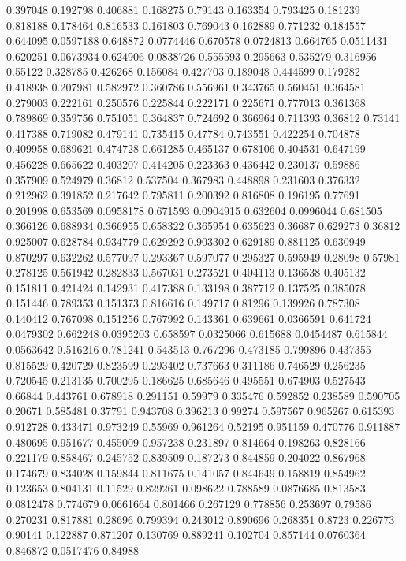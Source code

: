 0.397048 0.192798
0.406881 0.168275
0.79143 0.163354
0.793425 0.181239
0.818188 0.178464
0.816533 0.161803
0.769043 0.162889
0.771232 0.184557
0.644095 0.0597188
0.648872 0.0774446
0.670578 0.0724813
0.664765 0.0511431
0.620251 0.0673934
0.624906 0.0838726
0.555593 0.295663
0.535279 0.316956
0.55122 0.328785
0.426268 0.156084
0.427703 0.189048
0.444599 0.179282
0.418938 0.207981
0.582972 0.360786
0.556961 0.343765
0.560451 0.364581
0.279003 0.222161
0.250576 0.225844
0.222171 0.225671
0.777013 0.361368
0.789869 0.359756
0.751051 0.364837
0.724692 0.366964
0.711393 0.36812
0.73141 0.417388
0.719082 0.479141
0.735415 0.47784
0.743551 0.422254
0.704878 0.409958
0.689621 0.474728
0.661285 0.465137
0.678106 0.404531
0.647199 0.456228
0.665622 0.403207
0.414205 0.223363
0.436442 0.230137
0.59886 0.357909
0.524979 0.36812
0.537504 0.367983
0.448898 0.231603
0.376332 0.212962
0.391852 0.217642
0.795811 0.200392
0.816808 0.196195
0.77691 0.201998
0.653569 0.0958178
0.671593 0.0904915
0.632604 0.0996044
0.681505 0.366126
0.688934 0.366955
0.658322 0.365954
0.635623 0.36687
0.629273 0.36812
0.925007 0.628784
0.934779 0.629292
0.903302 0.629189
0.881125 0.630949
0.870297 0.632262
0.577097 0.293367
0.597077 0.295327
0.595949 0.28098
0.57981 0.278125
0.561942 0.282833
0.567031 0.273521
0.404113 0.136538
0.405132 0.151811
0.421424 0.142931
0.417388 0.133198
0.387712 0.137525
0.385078 0.151446
0.789353 0.151373
0.816616 0.149717
0.81296 0.139926
0.787308 0.140412
0.767098 0.151256
0.767992 0.143361
0.639661 0.0366591
0.641724 0.0479302
0.662248 0.0395203
0.658597 0.0325066
0.615688 0.0454487
0.615844 0.0563642
0.516216 0.781241
0.543513 0.767296
0.473185 0.799896
0.437355 0.815529
0.420729 0.823599
0.293402 0.737663
0.311186 0.746529
0.256235 0.720545
0.213135 0.700295
0.186625 0.685646
0.495551 0.674903
0.527543 0.66844
0.443761 0.678918
0.291151 0.59979
0.335476 0.592852
0.238589 0.590705
0.20671 0.585481
0.37791 0.943708
0.396213 0.99274
0.597567 0.965267
0.615393 0.912728
0.433471 0.973249
0.55969 0.961264
0.52195 0.951159
0.470776 0.911887
0.480695 0.951677
0.455009 0.957238
0.231897 0.814664
0.198263 0.828166
0.221179 0.858467
0.245752 0.839509
0.187273 0.844859
0.204022 0.867968
0.174679 0.834028
0.159844 0.811675
0.141057 0.844649
0.158819 0.854962
0.123653 0.804131
0.11529 0.829261
0.098622 0.788589
0.0876685 0.813583
0.0812478 0.774679
0.0661664 0.801466
0.267129 0.778856
0.253697 0.79586
0.270231 0.817881
0.28696 0.799394
0.243012 0.890696
0.268351 0.8723
0.226773 0.90141
0.122887 0.871207
0.130769 0.889241
0.102704 0.857144
0.0760364 0.846872
0.0517476 0.84988
